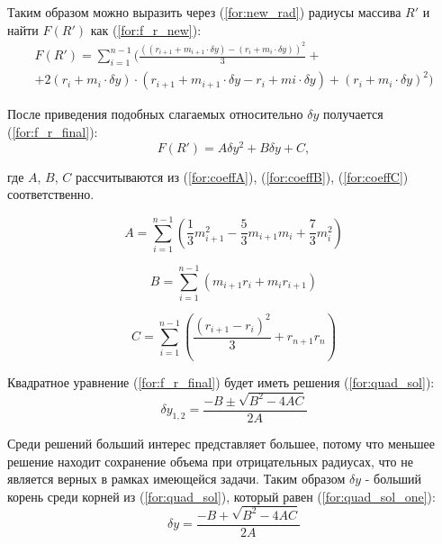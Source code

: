 Таким образом можно выразить через (\ref{for:new_rad}) радиусы массива $R'$ и найти $F(R')$ как (\ref{for:f_r_new}):
\begin{equation}
    \label{for:f_r_new}
    \begin{split}
        F(R') = \sum_{i=1}^{n-1} (\frac{((r_{i + 1} + m_{i + 1} \cdot \delta y) - (r_i + m_{i} \cdot \delta y))^2}{3} + \\
        + 2 (r_i + m_i \cdot \delta y) \cdot (r_{i + 1} + m_{i + 1} \cdot \delta y - r_i + m{i} \cdot \delta y) + (r_i + m_i \cdot \delta y)^2)
    \end{split}
\end{equation}

После приведения подобных слагаемых относительно $\delta y$ получается (\ref{for:f_r_final}):
\begin{equation}
    \label{for:f_r_final}
        F(R') = A \delta y^2 + B \delta y + C,
\end{equation}

где $A$, $B$, $C$ рассчитываются из (\ref{for:coeffA}), (\ref{for:coeffB}), (\ref{for:coeffC}) соответственно.

\begin{equation}
    \label{for:coeffA}
    A = \sum_{i=1}^{n-1}\left(\frac{1}{3}m_{i + 1}^2 - \frac{5}{3}m_{i + 1}m_i + \frac{7}{3}m_i^2 \right)
\end{equation}

\begin{equation}
    \label{for:coeffB}
    B = \sum_{i=1}^{n-1}\left(m_{i + 1}r_i + m_ir_{i + 1} \right)
\end{equation}

\begin{equation}
    \label{for:coeffC}
    C = \sum_{i=1}^{n-1}\left(\frac{(r_{i + 1} - r_i)^2}{3} + r_{n + 1}r_n\right)
\end{equation}

Квадратное уравнение (\ref{for:f_r_final}) будет иметь решения (\ref{for:quad_sol}):
\begin{equation}
    \label{for:quad_sol}
    \delta y_{1, 2} = \frac{-B \pm \sqrt{B^2 - 4AC}}{2A}
\end{equation}

Среди решений больший интерес представляет большее, потому что меньшее решение находит сохранение объема при отрицательных радиусах, что не является верных в рамках имеющейся задачи. Таким образом $\delta y$ - больший корень среди корней из (\ref{for:quad_sol}), который равен (\ref{for:quad_sol_one}):
\begin{equation}
    \label{for:quad_sol_one}
    \delta y = \frac{-B + \sqrt{B^2 - 4AC}}{2A}
\end{equation}

